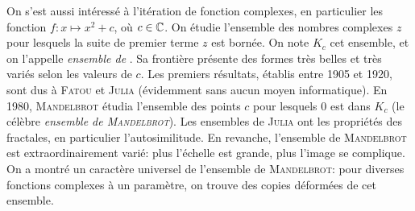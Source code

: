 {On s'est aussi intéressé à l'itération de fonction complexes, en particulier les fonction $f : x \mapsto x^2 + c$, où $c \in \mathbb{C}$. On étudie l'ensemble des nombres complexes $z$ pour lesquels la suite de premier terme $z$ est bornée. On note $K_c$ cet ensemble, et on l'appelle \emph{ensemble de }. Sa frontière présente des formes très belles et très variés selon les valeurs de $c$. Les premiers résultats, établis entre 1905 et 1920, sont dus à \textsc{Fatou} et \textsc{Julia} (évidemment sans aucun moyen informatique). En 1980, \textsc{Mandelbrot} étudia l'ensemble des points $c$ pour lesquels $0$ est dans $K_c$ (le célèbre \emph{ensemble de \textsc{Mandelbrot}}). Les ensembles de \textsc{Julia} ont les propriétés des fractales, en particulier l'autosimilitude. En revanche, l'ensemble de \textsc{Mandelbrot} est extraordinairement varié: plus l'échelle est grande, plus l'image se complique. On a montré un caractère universel de l'ensemble de \textsc{Mandelbrot}: pour diverses fonctions complexes à un paramètre, on trouve des copies déformées de cet ensemble. 
}

